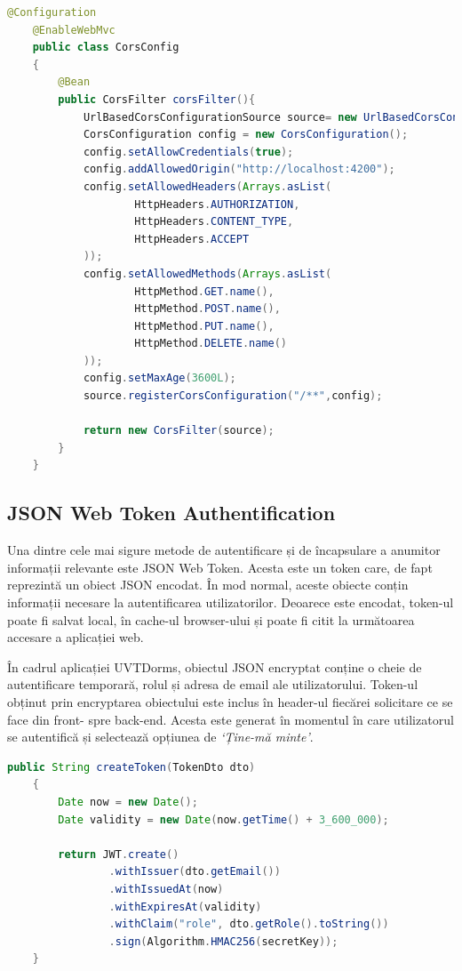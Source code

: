 \documentclass[12pt,a4paper]{report}
\theoremstyle{definition}
\theoremstyle{remark}
\begin{document}
\begin{lstlisting}[language=Java, caption={Clasa prin care se realizează configurarea CORS}]
    @Configuration
    @EnableWebMvc
    public class CorsConfig
    {
        @Bean
        public CorsFilter corsFilter(){
            UrlBasedCorsConfigurationSource source= new UrlBasedCorsConfigurationSource();
            CorsConfiguration config = new CorsConfiguration();
            config.setAllowCredentials(true);
            config.addAllowedOrigin("http://localhost:4200");
            config.setAllowedHeaders(Arrays.asList(
                    HttpHeaders.AUTHORIZATION,
                    HttpHeaders.CONTENT_TYPE,
                    HttpHeaders.ACCEPT
            ));
            config.setAllowedMethods(Arrays.asList(
                    HttpMethod.GET.name(),
                    HttpMethod.POST.name(),
                    HttpMethod.PUT.name(),
                    HttpMethod.DELETE.name()
            ));
            config.setMaxAge(3600L);
            source.registerCorsConfiguration("/**",config);

            return new CorsFilter(source);
        }
    }
\end{lstlisting}

\subsection{JSON Web Token Authentification}
\par Una dintre cele mai sigure metode de autentificare și de încapsulare a anumitor informații relevante este JSON Web Token\cite{jones2015json}. Acesta este un token care, de fapt reprezintă un obiect JSON encodat. În mod normal, aceste obiecte conțin informații necesare la autentificarea utilizatorilor. Deoarece este encodat, token-ul poate fi salvat local, în cache-ul browser-ului și poate fi citit la următoarea accesare a aplicației web.

\par În cadrul aplicației UVTDorms, obiectul JSON encryptat conține o cheie de autentificare temporară, rolul și adresa de email ale utilizatorului. Token-ul obținut prin encryptarea obiectului este inclus în header-ul fiecărei solicitare ce se face din front- spre back-end. Acesta este generat în momentul în care utilizatorul se autentifică și selectează opțiunea de \textit{`Ține-mă minte'}.

\begin{lstlisting}[language=Java, caption={Funcția de generare a token-ului}]
    public String createToken(TokenDto dto)
    {
        Date now = new Date();
        Date validity = new Date(now.getTime() + 3_600_000);

        return JWT.create()
                .withIssuer(dto.getEmail())
                .withIssuedAt(now)
                .withExpiresAt(validity)
                .withClaim("role", dto.getRole().toString())
                .sign(Algorithm.HMAC256(secretKey));
    }
\end{lstlisting}
\end{document}
